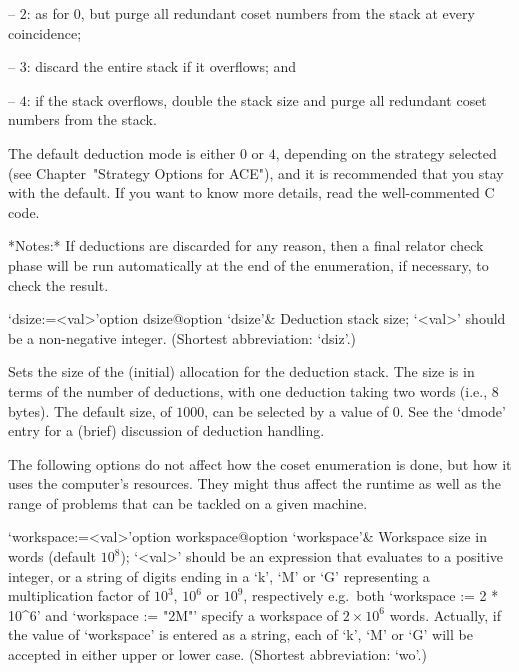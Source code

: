 \item{--} $2$: 
as for 0, but purge all redundant coset  numbers  from  the  stack  at
every coincidence;

\item{--} $3$:
discard the entire stack if it overflows; and

\item{--} $4$:
if the stack overflows, double the stack size and purge all  redundant
coset numbers from the stack.

\endlist

The default deduction mode is either $0$  or  $4$,  depending  on  the
strategy selected (see Chapter~"Strategy Options for ACE"), and it  is
recommended that you stay with the default. If you want to  know  more
details, read the well-commented C code.

*Notes:*
If deductions are discarded for any reason, then a final relator check
phase  will be run  automatically at  the end  of the  enumeration, if
necessary, to check the result.

\>`dsize:=<val>'{option dsize}@{option `dsize'}&
Deduction stack size; `<val>' should be a non-negative integer.
(Shortest abbreviation: `dsiz'.)

Sets the  size of  the (initial) allocation  for the  deduction stack.
The size is  in terms of the number of  deductions, with one deduction
taking two words (i.e., 8 bytes).  The default size, of $1000$, can be
selected  by  a value  of  0.   See the  `dmode' entry  for a  (brief)
discussion of deduction handling.

\enditems


The following options do not affect how the coset enumeration is done,
but how it  uses the computer's resources. They  might thus affect the
runtime as  well as  the range of  problems that  can be tackled  on a
given machine.

\beginitems

\>`workspace:=<val>'{option workspace}@{option `workspace'}&
Workspace size in words (default $10^8$);
`<val>' should be an expression that evaluates to a positive  integer,
or a string of digits ending in a  `k',  `M'  or  `G'  representing  a
multiplication  factor  of  $10^3$,  $10^6$  or  $10^9$,  respectively
e.g.~both `workspace := 2 * 10^6' and `workspace :=  "2M"'  specify  a
workspace  of  $2\times10^6$  words.  Actually,  if   the   value   of
`workspace' is entered as a string, each of `k', `M' or  `G'  will  be
accepted in either upper or lower case. (Shortest abbreviation: `wo'.)

